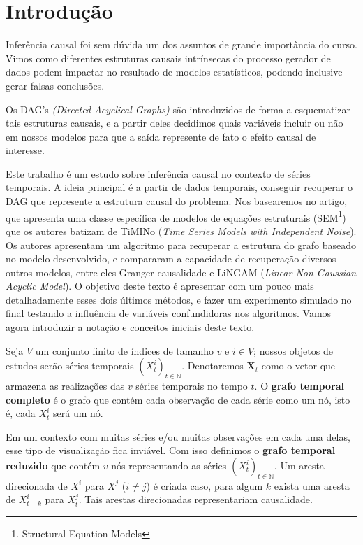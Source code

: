 \documentclass[12pt,letterpaper]{article}
\newcommand{\bd}[1]{\boldsymbol{#1}}
\newcommand{\N}{\mathbb{N}}
\begin{document}
	\tableofcontents
	\newpage
	\section{Introdução}
	
	Inferência causal foi sem dúvida um dos assuntos de grande importância do curso. Vimos como diferentes estruturas causais intrínsecas do processo gerador de dados podem impactar no resultado de modelos estatísticos, podendo inclusive gerar falsas conclusões. 
	
	Os DAG's \textit{(Directed Acyclical Graphs)} são introduzidos de forma a esquematizar tais estruturas causais, e a partir deles decidimos quais variáveis incluir ou não em nossos modelos para que a saída represente de fato o efeito causal de interesse. 
	
	Este trabalho é um estudo sobre inferência causal no contexto de séries temporais. A ideia principal é a partir de dados temporais, conseguir recuperar o DAG que represente a estrutura causal do problema. Nos basearemos no artigo\cite{Peters2012phd}, que apresenta uma classe específica de modelos de equações estruturais (SEM\footnote{Structural Equation Models}) que os autores batizam de TiMINo (\textit{Time Series Models with Independent Noise}). Os autores apresentam um algoritmo para recuperar a estrutura do grafo baseado no modelo desenvolvido, e compararam a capacidade de recuperação diversos outros modelos, entre eles Granger-causalidade\cite{shay_2019} e LiNGAM (\textit{Linear Non-Gaussian Acyclic Model})\cite{tslingam}\cite{lingam}. O objetivo deste texto é apresentar com um pouco mais detalhadamente esses dois últimos métodos, e fazer um experimento simulado no final testando a influência de variáveis confundidoras nos algoritmos. Vamos agora introduzir a notação e conceitos iniciais deste texto.
	
	 Seja $V$ um conjunto finito de índices de tamanho $v$ e $i\in V$; nossos objetos de estudos serão séries temporais $(X_t^i)_{t\in\N}$. Denotaremos $\bd X_t$ como o vetor que armazena as realizações das $v$ séries temporais no tempo $t$. O \textbf{grafo temporal completo} é o grafo que contém cada observação de cada série como um nó, isto é, cada $X_t^i$ será um nó.
	 
	 Em um contexto com muitas séries e/ou muitas observações em cada uma delas, esse tipo de visualização fica inviável. Com isso definimos o \textbf{grafo temporal reduzido} que contém $v$ nós representando as séries $(X_t^i)_{t\in\N}$. Um aresta direcionada de $X^i$ para $X^j$ ($i\neq j$) é criada caso, para algum $k$ exista uma aresta de $X^i_{t-k}$ para $X^j_t$. Tais arestas direcionadas representariam causalidade. 
	 
\end{document}
